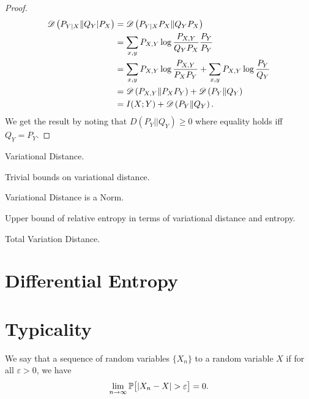 \documentclass[11pt,a4paper]{article}
\begin{document}
\begin{proof}
    \begin{align*}
        \mathscr{D} \left(P_{Y|X}\|Q_{Y}|P_{X}\right) &= \mathscr{D} \left(P_{Y|X}P_{X}\|Q_{Y}P_{X}\right) \\ 
        &= \sum_{x,y} P_{X,Y} \log{\frac{P_{X,Y}}{Q_{Y}P_{X}} \frac{P_{Y}}{P_{Y}}} \\ 
        &= \sum_{x,y} P_{X,Y} \log{\frac{P_{X,Y}}{P_{X}P_{Y}} + \sum_{x,y} P_{X,Y} \log{\frac{P_{Y}}{Q_{Y}}}} \\ 
        &= \mathscr{D} \left(P_{X,Y}\|P_X P_Y\right) + \mathscr{D} \left(P_{Y}\|Q_Y\right) \\ 
        &= I(X;Y) + \mathscr{D} \left(P_{Y}\|Q_Y\right).
    \end{align*}
    We get the result by noting that $D(P_{Y}||Q_{Y}) \ge 0$ where equality holds iff $Q_{Y} = P_{Y}.$        
\end{proof}

\begin{definition}
    Variational Distance.
\end{definition}

\begin{remark}
    Trivial bounds on variational distance.
\end{remark}

\begin{remark}
    Variational Distance is a Norm.
\end{remark}

\begin{theorem}
    Upper bound of relative entropy in terms of variational distance and entropy.
\end{theorem}

\begin{theorem}

\end{theorem}

\begin{definition}
    Total Variation Distance.
\end{definition}

\section{Differential Entropy}

\section{Typicality}

\begin{definition}
    We say that a sequence of random variables $\{X_n\}$  to a random variable $X$ if for all $\varepsilon > 0$, we have 
    \begin{equation*}
        \lim_{n\rightarrow \infty} \mathbb{P}\big[ |X_n - X| > \varepsilon \big] = 0.
    \end{equation*}
\end{definition}
\end{document}
